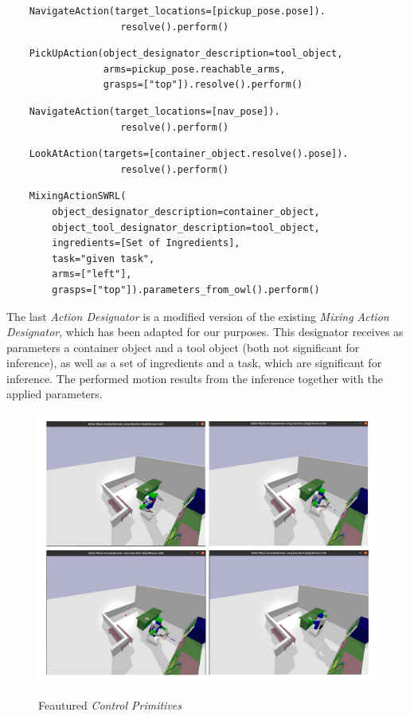\begin{lstlisting}
	NavigateAction(target_locations=[pickup_pose.pose]).
					resolve().perform()
\end{lstlisting}

\newpage

\begin{lstlisting}
	PickUpAction(object_designator_description=tool_object,
                 arms=pickup_pose.reachable_arms,
                 grasps=["top"]).resolve().perform()
\end{lstlisting}

\begin{lstlisting}
	NavigateAction(target_locations=[nav_pose]).
					resolve().perform()
\end{lstlisting}

\begin{lstlisting}
	LookAtAction(targets=[container_object.resolve().pose]).
					resolve().perform()
\end{lstlisting}

\begin{lstlisting}
	MixingActionSWRL(
		object_designator_description=container_object,
        object_tool_designator_description=tool_object,
		ingredients=[Set of Ingredients],
        task="given task",
        arms=["left"],
        grasps=["top"]).parameters_from_owl().perform()
\end{lstlisting}

The last \textit{Action Designator} is a modified version of the existing \textit{Mixing Action Designator}, which has been adapted for our purposes. This designator receives as parameters a container object and a tool object (both not significant for inference), as well as a set of ingredients and a task, which are significant for inference. The performed motion results from the inference together with the applied parameters.

\begin{figure}[H]
    \includegraphics[scale=0.3]{Graphics/control_primitives.jpg}
    \label{fig:controlprimitives}
    \caption{Feautured \textit{Control Primitives}}
\end{figure}

